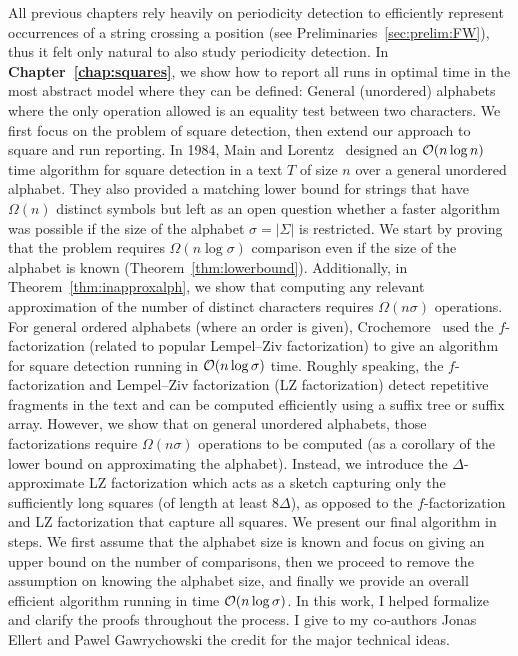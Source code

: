 All previous chapters rely heavily on periodicity detection to efficiently represent occurrences of a string crossing a position (see Preliminaries~\ref{sec:prelim:FW}), thus it felt only natural to also study periodicity detection. In \textbf{Chapter~\ref{chap:squares}}, we show how to report all runs  in optimal time in the most abstract model where they can be defined: General (unordered) alphabets where the only operation allowed is an equality test between two characters. 
We first focus on the problem of square detection, then extend our approach to square and run reporting.
In 1984, Main and Lorentz~\cite{Main1984} designed an $\mathcal{O}(n\log n)$ time algorithm for square detection in a text $T$ of size $n$ over a general unordered alphabet. They also provided a matching lower bound for strings that have $\Omega(n)$ distinct symbols but left as an open question whether a faster algorithm was possible if the size of the alphabet $\sigma=|\Sigma|$ is restricted.
We start by proving that the problem requires $\Omega(n \log \sigma)$ comparison even if the size of the alphabet is known (Theorem~\ref{thm:lowerbound}). Additionally, in Theorem~\ref{thm:inapproxalph}, we show that computing any relevant approximation of the number of distinct characters requires $\Omega(n\sigma)$ operations.
For general ordered alphabets (where an order is given), Crochemore~\cite{Crochemore1986} used the $f$-factorization (related to popular Lempel--Ziv factorization) to give an algorithm for square detection running in $\mathcal{O}(n\log \sigma)$ time. Roughly speaking, the $f$-factorization and Lempel--Ziv factorization (LZ factorization) detect repetitive fragments in the text and can be computed efficiently using a suffix tree or suffix array. However,  we show that on general unordered alphabets, those factorizations require $\Omega(n\sigma)$ operations to be computed (as a corollary of the lower bound on approximating the alphabet). %
Instead, we introduce the $\Delta$-approximate LZ factorization which acts as a sketch capturing only the sufficiently long squares (of length at least $8\Delta$), as opposed to the $f$-factorization and LZ factorization that capture all squares.
We present our final algorithm in steps. We first assume that the alphabet size is known and focus on giving an upper bound on the number of comparisons, then we proceed to remove the assumption on knowing the alphabet size, and finally we provide an overall efficient algorithm running in time $\mathcal{O}(n\log\sigma)$.
In this work, I helped formalize and clarify the proofs throughout the process. I give to my co-authors Jonas Ellert and Pawel Gawrychowski the credit for the major technical ideas.

